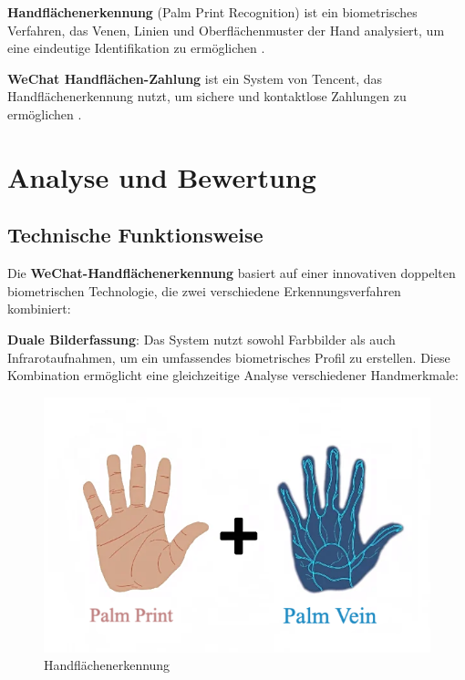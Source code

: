 \documentclass[paper=a4,fontsize=12pt,ngerman]{scrartcl}
\begin{document}
\textbf{Handflächenerkennung} (Palm Print Recognition) ist ein biometrisches Verfahren, 
das Venen, Linien und Oberflächenmuster der Hand analysiert, um eine eindeutige 
Identifikation zu ermöglichen \cite{innovatrics2025palm}.

\textbf{WeChat Handflächen-Zahlung} ist ein System von Tencent, das Handflächenerkennung 
nutzt, um sichere und kontaktlose Zahlungen zu ermöglichen \cite{tencent2024palm}.

\vspace{2cm}

\section{Analyse und Bewertung}

\subsection{Technische Funktionsweise}
Die \textbf{WeChat-Handflächenerkennung} basiert auf einer innovativen doppelten 
biometrischen Technologie, die zwei verschiedene Erkennungsverfahren kombiniert:

\textbf{Duale Bilderfassung}: Das System nutzt sowohl Farbbilder als auch 
Infrarotaufnahmen, um ein umfassendes biometrisches Profil zu erstellen. Diese 
Kombination ermöglicht eine gleichzeitige Analyse verschiedener Handmerkmale:

\begin{figure}[h]
\begin{center}
  \includegraphics[scale=0.35]{graphics/palm.png}
  \caption{Handflächenerkennung}
  \label{handfläche}
\end{center}
\end{figure}
\end{document}
